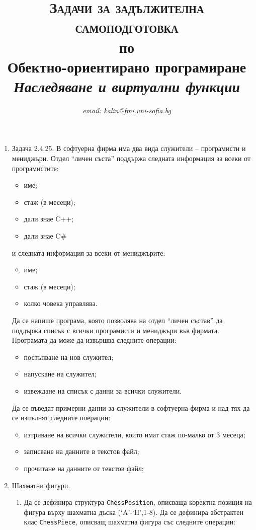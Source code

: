 \documentclass[12pt,a4paper]{article}
\author{\textit{email: kalin@fmi.uni-sofia.bg}}
\title{\textsc{Задачи за задължителна самоподготовка} \\
по \\
Обектно-ориентирано програмиране\\
\textit{Наследяване и виртуални функции}}
\newcommand{\code}[1]{\texttt{#1}}
\begin{document}
\maketitle


\begin{enumerate}

	\item Задача 2.4.25. В софтуерна фирма има два вида служители – програмисти и мениджъри. Отдел ``личен съста'' поддържа следната информация за всеки от програмистите:
	\begin{itemize}
		\item име;
		\item стаж (в месеци);
		\item дали знае C++;
		\item дали знае C\#
	\end{itemize}
	и следната информация за всеки от мениджърите:
	\begin{itemize}
		\item име;
		\item стаж (в месеци);
		\item колко човека управлява.
	\end{itemize}

	Да се напише програма, която позволява на отдел ``личен състав'' да поддържа списък с всички програмисти и мениджъри във фирмата. Програмата да може да извършва следните операции:
	\begin{itemize}
		\item постъпване на нов служител;
		\item напускане на служител;
		\item извеждане на списък с данни за всички служители.
	\end{itemize}

	Да се въведат примерни данни за служители  в софтуерна фирма и над тях да се изпълнят следните операции:

	\begin{itemize}
		\item изтриване на всички служители, които имат стаж по-малко от 3 месеца;
		\item записване на данните в текстов файл;
		\item прочитане на данните от текстов файл;
	\end{itemize}


	\item Шахматни фигури.\\

	\begin{enumerate}
		\item Да се дефинира структура \code{ChessPosition}, описваща коректна позиция на фигура върху шахматна дъска (‘A’-‘H’,1-8). Да се дефинира абстрактен клас \code{ChessPiece}, описващ шахматна фигура със следните операции:


\end{enumerate}
\end{enumerate}
\end{document}
